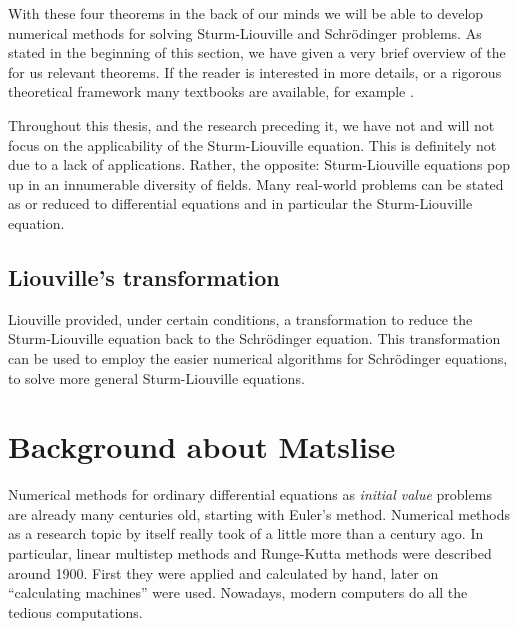 With these four theorems in the back of our minds we will be able to develop numerical methods for solving Sturm-Liouville and Schrödinger problems. As stated in the beginning of this section, we have given a very brief overview of the for us relevant theorems. If the reader is interested in more details, or a rigorous theoretical framework many textbooks are available, for example \cite{sagan_boundary_1961,al-gwaiz_sturmliouville_2008,zettl_sturmliouville_2012,guenther_sturmliouville_2018}.

Throughout this thesis, and the research preceding it, we have not and will not focus on the applicability of the Sturm-Liouville equation. This is definitely not due to a lack of applications. Rather, the opposite: Sturm-Liouville equations pop up in an innumerable diversity of fields. Many real-world problems can be stated as or reduced to differential equations and in particular the Sturm-Liouville equation.


\subsection{Liouville's transformation}\label{sec:c2_liouville_transformation}

Liouville provided, under certain conditions, a transformation to reduce the Sturm-Liouville equation back to the Schrödinger equation. This transformation can be used to employ the easier numerical algorithms for Schrödinger equations, to solve more general Sturm-Liouville equations.

\section{Background about Matslise}

Numerical methods for ordinary differential equations as \emph{initial value} problems are already many centuries old, starting with Euler's method. Numerical methods as a research topic by itself really took of a little more than a century ago. In particular, linear multistep methods and Runge-Kutta methods were described around 1900. First they were applied and calculated by hand, later on ``calculating machines'' \cite{milne_numerical_1926} were used. Nowadays, modern computers do all the tedious computations.

